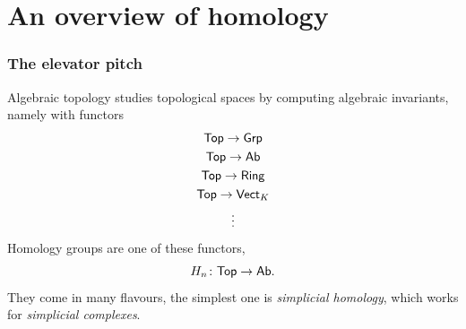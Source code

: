 \documentclass{beamer}
\begin{document}
\section{An overview of homology}
\begin{frame}
	\frametitle{The elevator pitch}
	Algebraic topology studies topological spaces by computing algebraic invariants, namely
	with functors
	\begin{gather*}
		\mathsf{Top} \to \mathsf{Grp} \\ 
		\mathsf{Top} \to \mathsf{Ab} \\
		\mathsf{Top} \to \mathsf{Ring} \\
		\mathsf{Top} \to \mathsf{Vect}_K \\
				 \vdots
	\end{gather*}
	\pause
	Homology groups are one of these functors,
	\begin{equation*}
		H_n \colon \mathsf{Top} \to \mathsf{Ab}. 
	\end{equation*}
	\pause
	They come in many flavours, the simplest one is \emph{simplicial homology}, which works
	for \emph{simplicial complexes}. 
\end{frame}
\end{document}
